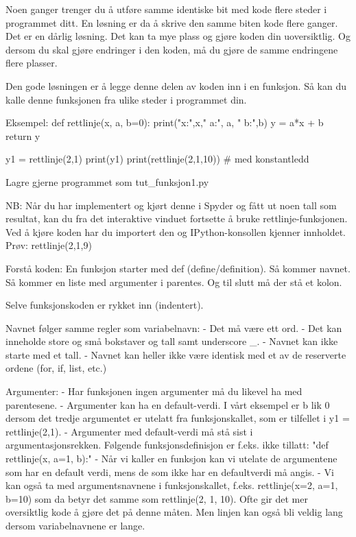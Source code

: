 {Noen ganger trenger du å utføre samme identiske bit med kode 
flere steder i programmet ditt.
En løsning er da å skrive den samme biten kode flere ganger.
Det er en dårlig løsning.
Det kan ta mye plass og gjøre koden din uoversiktlig. 
Og dersom du skal gjøre endringer i den koden, 
må du gjøre de samme endringene flere plasser. 

Den gode løsningen er å legge denne delen av koden inn i en funksjon. 
Så kan du kalle denne funksjonen fra ulike steder i programmet din.

Eksempel:
def rettlinje(x, a, b=0):
    print("x:",x,"  a:", a, "  b:",b)
    y = a*x + b
    return y
    
y1 = rettlinje(2,1)
print(y1)
print(rettlinje(2,1,10))   # med konstantledd


Lagre gjerne programmet som tut_funksjon1.py 

NB: Når du har implementert og kjørt denne i Spyder og fått ut noen tall som resultat, 
kan du fra det interaktive vinduet fortsette å bruke rettlinje-funksjonen.
Ved å kjøre koden har du importert den og IPython-konsollen kjenner innholdet. 
Prøv:
rettlinje(2,1,9) 


Forstå koden: 
En funksjon starter med def (define/definition). 
Så kommer navnet. 
Så kommer en liste med argumenter i parentes. 
Og til slutt må der stå et kolon. 

Selve funksjonskoden er rykket inn (indentert).

Navnet følger samme regler som variabelnavn: 
- Det må være ett ord.
- Det kan inneholde store og små bokstaver og tall samt underscore _.
- Navnet kan ikke starte med et tall.
- Navnet kan heller ikke være identisk med et av de reserverte ordene (for, if, list, etc.) 

Argumenter:
- Har funksjonen ingen argumenter må du likevel ha med parentesene. 
- Argumenter kan ha en default-verdi. 
    I vårt eksempel er b lik 0 dersom det tredje argumentet er utelatt fra 
    funksjonskallet, som er tilfellet i y1 = rettlinje(2,1).
- Argumenter med default-verdi må stå sist i argumentasjonsrekken. 
  Følgende funksjonsdefinisjon er f.eks. ikke tillatt:  "def rettlinje(x, a=1, b):" 
- Når vi kaller en funksjon kan vi utelate de argumentene som har en default verdi, 
  mens de som ikke har en defaultverdi må angis. 
- Vi kan også ta med argumentsnavnene i funksjonskallet, f.eks. rettlinje(x=2, a=1, b=10) 
  som da betyr det samme som rettlinje(2, 1, 10). 
  Ofte gir det mer oversiktlig kode å gjøre det på denne måten. 
  Men linjen kan også bli veldig lang dersom variabelnavnene er lange. 

}
